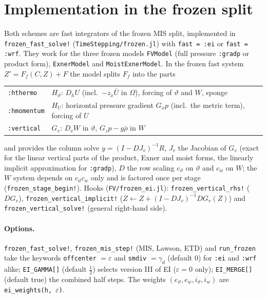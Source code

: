 \documentclass[11pt,a4paper]{article}
\newcommand{\code}[1]{\texttt{\small #1}}
\newcommand{\tv}{\vartheta}   %
\begin{document}
\section{Implementation in the frozen split}\label{sec:impl}
Both schemes are fast integrators of the frozen MIS split, implemented in
\code{frozen\_fast\_solve!} (\code{TimeStepping/frozen.jl}) with \code{fast = :ei} or \code{fast = :wrf}. They work for the three
frozen models \code{FVModel} (full pressure \code{:gradp} or product form), \code{ExnerModel} and
\code{MoistExnerModel}. In
the frozen fast system $Z'=F_f(C,Z)+F$ the model splits $F_f$ into the parts
\begin{center}\small
\begin{tabular}{ll}\toprule
\code{:hthermo} & $H_\tv$: $D_hU$ (incl.\ $-z_x\bar U$ in $\Omega$), forcing of $\tv$ and $W$, sponge\\
\code{:hmomentum} & $H_U$: horizontal pressure gradient $G_xp$ (incl.\ the metric term), forcing of $U$\\
\code{:vertical} & $G_v$: $D_vW$ in $\tv$, $G_zp-g\bar\rho$ in $W$\\\bottomrule
\end{tabular}
\end{center}
and provides the column solve $y=(I-DJ_v)^{-1}R$, $J_v$ the Jacobian of $G_v$ (exact for the linear
vertical parts of the product, Exner and moist forms, the linearly implicit approximation for
\code{:gradp}), $D$ the row scaling $c_\tv$ on $\tv$ and $c_w$ on $W$; the $W$ system depends on $c_\tv c_w$ only and is
factored once per stage (\code{frozen\_stage\_begin!}). Hooks (\code{FV/frozen\_ei.jl}):
\code{frozen\_vertical\_rhs!} ($DG_v$), \code{frozen\_vertical\_implicit!} ($Z\leftarrow Z+(I-DJ_v)^{-1}DG_v(Z)$) and
\code{frozen\_vertical\_solve!} (general right-hand side).

\paragraph{Options.} \code{frozen\_fast\_solve!}, \code{frozen\_mis\_step!} (MIS, Lawson, ETD) and \code{run\_frozen} take the
keywords \code{offcenter} $=\varepsilon$ and \code{smdiv} $=\gamma_d$ (default 0) for \code{:ei} and \code{:wrf} alike; \code{EI\_GAMMA[]}
(default $\tfrac12$) selects version III of EI ($\varepsilon=0$ only); \code{EI\_MERGE[]} (default true) the combined half steps.
The weights $(e_\tv,e_w,i_\tv,i_w)$ are \code{ei\_weights(h, $\varepsilon$)}.
\end{document}
